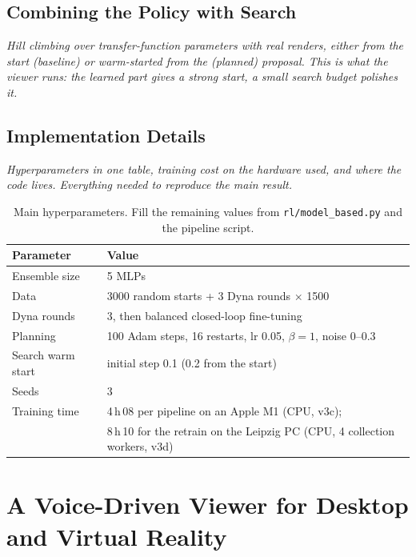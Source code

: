 \documentclass[12pt, a4paper]{book}
\newcommand{\plan}[1]{{\color{gray}\itshape #1\par}}
\begin{document}
\section{Combining the Policy with Search}
\label{sec:method-search}
\plan{Hill climbing over transfer-function parameters with real renders, either from the start (baseline) or warm-started from the (planned) proposal. This is what the viewer runs: the learned part gives a strong start, a small search budget polishes it.}

\section{Implementation Details}
\label{sec:method-impl}
\plan{Hyperparameters in one table, training cost on the hardware used, and where the code lives. Everything needed to reproduce the main result.}

\begin{table}[ht]
  \centering
  \caption[Hyperparameters]{Main hyperparameters. Fill the remaining values from \texttt{rl/model\_based.py} and the pipeline script.}
  \label{tab:method-hparams}
  \begin{tabular}{ll}
    \toprule
    Parameter & Value \\
    \midrule
    Ensemble size & 5 MLPs \\
    Data & 3000 random starts + 3 Dyna rounds $\times$ 1500 \\
    Dyna rounds & 3, then balanced closed-loop fine-tuning \\
    Planning & 100 Adam steps, 16 restarts, lr 0.05, $\beta = 1$, noise 0--0.3 \\
    Search warm start & initial step 0.1 (0.2 from the start) \\
    Seeds & 3 \\
    Training time & 4\,h\,08 per pipeline on an Apple M1 (CPU, v3c); \\
                  & 8\,h\,10 for the retrain on the Leipzig PC (CPU, 4 collection workers, v3d) \\
    \bottomrule
  \end{tabular}
\end{table}

\chapter{A Voice-Driven Viewer for Desktop and Virtual Reality}
\label{ch:system}
\end{document}
